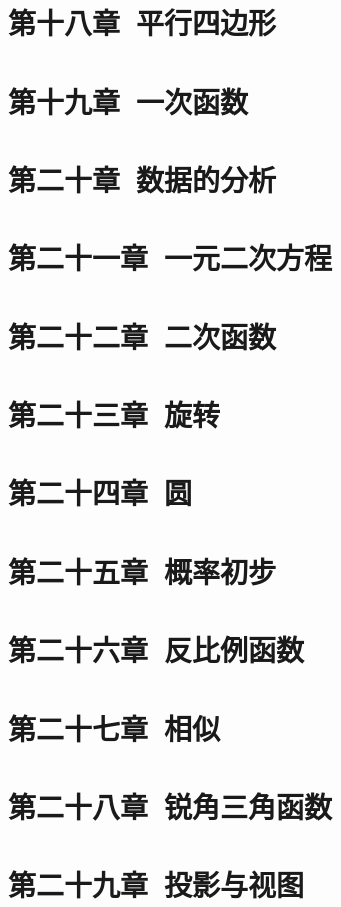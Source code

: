 \documentclass[UTF8,fontset=macnew]{book} %
\begin{document}
	\chapter{第十八章\ 平行四边形}

	\chapter{第十九章\ 一次函数}

	\chapter{第二十章\ 数据的分析}

	\chapter{第二十一章\ 一元二次方程}

	\chapter{第二十二章\ 二次函数}

	\chapter{第二十三章\ 旋转}

	\chapter{第二十四章\ 圆}

	\chapter{第二十五章\ 概率初步}

	\chapter{第二十六章\ 反比例函数}

	\chapter{第二十七章\ 相似}

	\chapter{第二十八章\ 锐角三角函数}

	\chapter{第二十九章\ 投影与视图}
\end{document}
